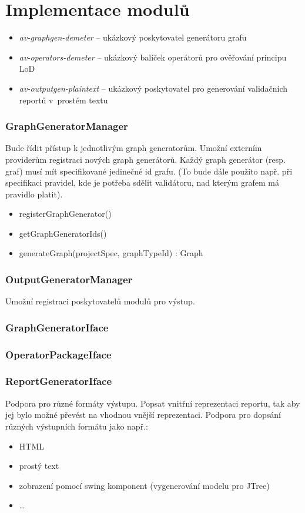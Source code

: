 \section{Implementace modulů}

\begin{itemize}
\item \emph{av-graphgen-demeter} -- ukázkový poskytovatel generátoru grafu
\item \emph{av-operators-demeter} -- ukázkový balíček operátorů pro ověřování principu LoD
\item \emph{av-outputgen-plaintext} -- ukázkový poskytovatel pro generování validačních reportů v~prostém textu
\end{itemize}

\subsubsection{GraphGeneratorManager}
Bude řídit přístup k jednotlivým graph generatorům. Umožní externím providerům registraci nových graph generátorů. Každý graph generátor (resp. graf) musí mít specifikované jedinečné id grafu. (To bude dále použito např. při specifikaci pravidel, kde je potřeba sdělit validátoru, nad kterým grafem má pravidlo platit).
\begin{itemize}
\item registerGraphGenerator()
\item getGraphGeneratorIds()
\item generateGraph(projectSpec, graphTypeId) : Graph
\end{itemize}

\subsubsection{OutputGeneratorManager}
Umožní registraci poskytovatelů modulů pro výstup.

\subsubsection{GraphGeneratorIface}
\subsubsection{OperatorPackageIface}
\subsubsection{ReportGeneratorIface}
Podpora pro různé formáty výstupu. Popsat vnitřní reprezentaci reportu, tak aby jej bylo možné převést na vhodnou vnější reprezentaci. Podpora pro dopsání různých výstupních formátu jako např.:
\begin{itemize}
\item HTML
\item prostý text
\item zobrazení pomocí swing komponent (vygenerování modelu pro JTree)
\item \ldots
\end{itemize}

